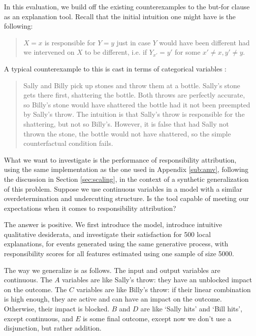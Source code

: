 \documentclass[anon,12pt]{clear2025} %
\begin{document}
In this evaluation, we build off the existing counterexamples to the but-for clause as an explanation tool. Recall that the  initial intuition one might have is the following:

\begin{quote}
$X=x$ is responsible for $Y=y$ just in case $Y$ would have been different had we intervened on $X$ to be different, i.e. if $Y_{x'} = y'$ for some $x' \neq x, y' \neq y$. 
\end{quote}

A typical counterexample to this is cast in terms of categorical variables \cite{actualCausalityHalpern}: 

\begin{quote} Sally and Billy pick up stones and throw them at a bottle. Sally’s stone gets there first, shattering the bottle. Both throws are perfectly accurate, so Billy’s stone would have shattered the bottle had it not been preempted by Sally’s throw. The intuition is that Sally's throw is responsible for the shattering, but not so Billy's. However, it is false that had Sally not thrown the stone, the bottle would not have shattered, so the simple counterfactual condition fails.
\end{quote}

What we want to investigate is the performance of responsibility attribution, using the same implementation as the one used in Appendix \ref{sub:amv}, following the discussion in Section \ref{sec:scaling}, in the context of a synthetic generalization of this problem. Suppose we use continuous variables in a model with a similar overdetermination and undercutting structure. Is the tool capable of meeting our expectations when it comes to responsibility attribution? 

The answer is positive. We first introduce the model, introduce intuitive qualitative desiderata, and investigate their satisfaction for 500 local explanations, for events generated using the same generative process, with responsibility scores for all features estimated using one sample of size 5000.

The way we generalize is as follows. The input and output variables are continuous. The $A$ variables are like Sally's throw: they have an unblocked impact on the outcome. The $C$ variables are like Billy's throw: if their linear combination is high enough, they are active and can have an impact on the outcome. Otherwise, their impact is blocked. $B$ and $D$ are like `Sally hits' and `Bill hits', except continuous, and $E$ is some final outcome, except now we don't use a disjunction, but rather addition. 
\end{document}
